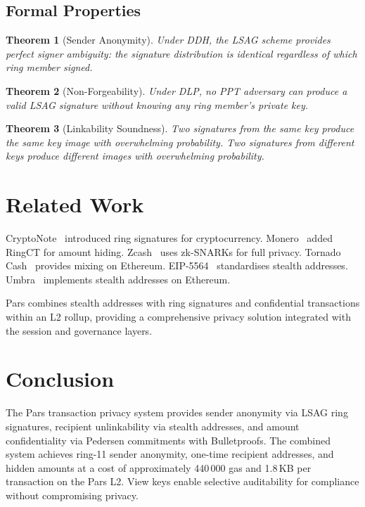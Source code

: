 \documentclass[11pt,a4paper]{article}
\newtheorem{theorem}{Theorem}[section]
\begin{document}
\subsection{Formal Properties}

\begin{theorem}[Sender Anonymity]
    Under DDH, the LSAG scheme provides perfect signer ambiguity: the
    signature distribution is identical regardless of which ring member
    signed.
\end{theorem}

\begin{theorem}[Non-Forgeability]
    Under DLP, no PPT adversary can produce a valid LSAG signature
    without knowing any ring member's private key.
\end{theorem}

\begin{theorem}[Linkability Soundness]
    Two signatures from the same key produce the same key image with
    overwhelming probability.  Two signatures from different keys produce
    different images with overwhelming probability.
\end{theorem}

\section{Related Work}
\label{sec:related}

CryptoNote~\cite{van2013cryptonote} introduced ring signatures for
cryptocurrency.  Monero~\cite{noether2015ring} added RingCT for amount
hiding.  Zcash~\cite{sasson2014zerocash} uses zk-SNARKs for full
privacy.  Tornado Cash~\cite{pertsev2019tornado} provides mixing on
Ethereum.  EIP-5564~\cite{eip5564} standardises stealth addresses.
Umbra~\cite{umbra2021} implements stealth addresses on Ethereum.

Pars combines stealth addresses with ring signatures and confidential
transactions within an L2 rollup, providing a comprehensive privacy
solution integrated with the session and governance layers.

\section{Conclusion}
\label{sec:conclusion}

The Pars transaction privacy system provides sender anonymity via LSAG
ring signatures, recipient unlinkability via stealth addresses, and amount
confidentiality via Pedersen commitments with Bulletproofs.  The combined
system achieves ring-11 sender anonymity, one-time recipient addresses,
and hidden amounts at a cost of approximately 440\,000 gas and 1.8\,KB per
transaction on the Pars L2.  View keys enable selective auditability for
compliance without compromising privacy.
\end{document}
